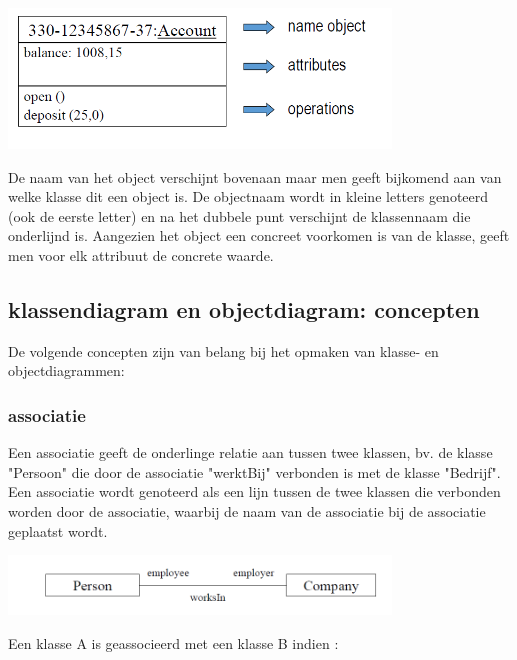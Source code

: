 
\begin{center}
\includegraphics[width=4in]{img/klas2}%
\end{center}

De naam van het object verschijnt bovenaan maar men geeft bijkomend aan van welke klasse dit een object is. De objectnaam wordt in kleine letters genoteerd (ook de eerste letter) en na het dubbele punt verschijnt de klassennaam die onderlijnd is.
Aangezien het object een concreet voorkomen is van de klasse, geeft men voor elk attribuut de concrete waarde.

\subsection{klassendiagram en objectdiagram: concepten}

De volgende concepten zijn van belang bij het opmaken van klasse- en objectdiagrammen:

\subsubsection{associatie}

Een associatie geeft de onderlinge relatie aan tussen twee klassen, bv. de klasse "Persoon" die door de associatie "werktBij" verbonden is met de klasse "Bedrijf". Een associatie wordt genoteerd als een lijn tussen de twee klassen die verbonden worden door de associatie, waarbij de naam van de associatie bij de associatie geplaatst wordt.


\begin{center}
\includegraphics[width=4in]{img/ass1}%
\end{center}

Een klasse A is geassocieerd met een klasse B indien :

